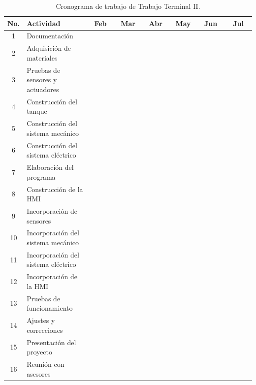 \documentclass[11pt,tesis,twoside,openright,spanish]{upiiztt}
\begin{document}
\begin{table}[H]
\centering
\caption{Cronograma de trabajo de Trabajo Terminal II.}
\label{tab:cronograma2}
\small
\begin{tabular}{clcccccccccccccccccccccccc}
\toprule
\textbf{No.} & \textbf{Actividad} & \multicolumn{4}{c}{\textbf{Feb}} & \multicolumn{4}{c}{\textbf{Mar}} & \multicolumn{4}{c}{\textbf{Abr}} & \multicolumn{4}{c}{\textbf{May}} & \multicolumn{4}{c}{\textbf{Jun}} & \multicolumn{4}{c}{\textbf{Jul}} \\
\midrule
1  & Documentación & & & & & & & & & & & & & & & & & & & & & & & & \\
2  & Adquisición de materiales & & & & & & & & & & & & & & & & & & & & & & & & \\
3  & Pruebas de sensores y actuadores & & & & & & & & & & & & & & & & & & & & & & & & \\
4  & Construcción del tanque & & & & & & & & & & & & & & & & & & & & & & & & \\
5  & Construcción del sistema mecánico & & & & & & & & & & & & & & & & & & & & & & & & \\
6  & Construcción del sistema eléctrico & & & & & & & & & & & & & & & & & & & & & & & & \\
7  & Elaboración del programa & & & & & & & & & & & & & & & & & & & & & & & & \\
8  & Construcción de la HMI & & & & & & & & & & & & & & & & & & & & & & & & \\
9  & Incorporación de sensores & & & & & & & & & & & & & & & & & & & & & & & & \\
10 & Incorporación del sistema mecánico & & & & & & & & & & & & & & & & & & & & & & & & \\
11 & Incorporación del sistema eléctrico & & & & & & & & & & & & & & & & & & & & & & & & \\
12 & Incorporación de la HMI & & & & & & & & & & & & & & & & & & & & & & & & \\
13 & Pruebas de funcionamiento & & & & & & & & & & & & & & & & & & & & & & & & \\
14 & Ajustes y correcciones & & & & & & & & & & & & & & & & & & & & & & & & \\
15 & Presentación del proyecto & & & & & & & & & & & & & & & & & & & & & & & & \\
16 & Reunión con asesores & & & & & & & & & & & & & & & & & & & & & & & & \\
\bottomrule
\end{tabular}
\end{table}
\end{document}
